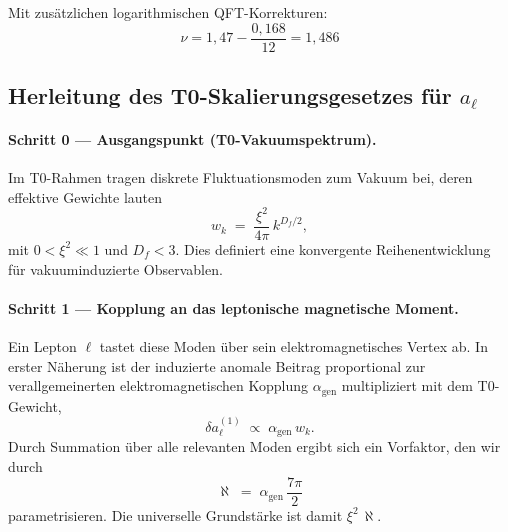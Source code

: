 \documentclass[12pt,a4paper]{article}
\begin{document}
		Mit zus\"atzlichen logarithmischen QFT-Korrekturen:
		\begin{equation}
			\nu = 1{,}47 - \frac{0{,}168}{12} = 1{,}486
		\end{equation}

	

	\subsection{Herleitung des T0-Skalierungsgesetzes für $a_\ell$}
	
	\paragraph{Schritt 0 — Ausgangspunkt (T0-Vakuumspektrum).}
	Im T0-Rahmen tragen diskrete Fluktuationsmoden zum Vakuum bei, deren effektive Gewichte lauten
	\[
	w_k \;=\; \frac{\xi^2}{4\pi}\,k^{D_f/2},
	\]
	mit $0<\xi^2\ll 1$ und $D_f<3$. Dies definiert eine konvergente Reihenentwicklung für vakuuminduzierte Observablen.
	
	\paragraph{Schritt 1 — Kopplung an das leptonische magnetische Moment.}

\newcommand{\xipar}{\xi}

\newcommand{\alphagem}{\alpha_{\mathrm{gen}}}

\newcommand{\nulep}{\nu_{\ell}}

\newcommand{\mchar}{m_{\mathrm{char}}}

	Ein Lepton $\ell$ tastet diese Moden über sein elektromagnetisches Vertex ab. In erster Näherung ist der induzierte anomale Beitrag proportional zur verallgemeinerten elektromagnetischen Kopplung $\alphagem$ multipliziert mit dem T0-Gewicht,
	\[
	\delta a_\ell^{(1)} \;\propto\; \alphagem\, w_k.
	\]
	Durch Summation über alle relevanten Moden ergibt sich ein Vorfaktor, den wir durch
	\[
	\aleph \;=\; \alphagem \,\frac{7\pi}{2}
	\]
	parametrisieren. Die universelle Grundstärke ist damit $\xipar^2\,\aleph$.
	
\end{document}
